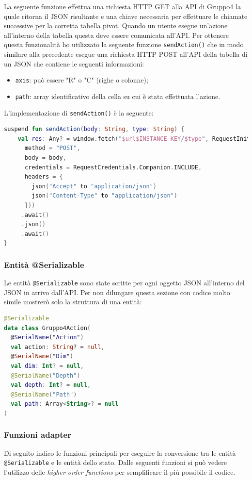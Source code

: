 \noindent
La seguente funzione effettua una richiesta HTTP GET alla API di Gruppo4 la quale ritorna il JSON risultante e una chiave necessaria per effettuare le chiamate successive per la corretta tabella pivot. Quando un utente esegue un'azione all'interno della tabella questa deve essere comunicata all'API. Per ottenere questa funzionalità ho utilizzato la seguente funzione \verb|sendAction()| che in modo similare alla precedente esegue una richiesta HTTP POST all'API della tabella di un JSON che contiene le seguenti informazioni:
\begin{itemize}
	\item \verb|axis|: può essere "R" o "C" (righe o colonne);
	\item \verb|path|: array identificativo della cella su cui è stata effettuata l'azione.
\end{itemize}
L'implementazione di \verb|sendAction()| è la seguente: 
\begin{lstlisting}[caption={Funzione sendAction()}, label={lst:bodycells}, language=Kotlin]
suspend fun sendAction(body: String, type: String) {
    val res: Any? = window.fetch("$url$INSTANCE_KEY/$type", RequestInit(
      method = "POST",
      body = body,
      credentials = RequestCredentials.Companion.INCLUDE,
      headers = {
        json("Accept" to "application/json")
        json("Content-Type" to "application/json")
      }))
     .await()
     .json()
     .await()
}
\end{lstlisting}

\subsubsection{Entità @Serializable}
Le entità \verb|@Serializable| sono state scritte per ogni oggetto JSON all'interno del JSON in arrivo dall'API. Per non dilungare questa sezione con codice molto simile mostrerò solo la struttura di una entità:
\begin{lstlisting}[caption={data class Gruppo4Action}, label={lst:bodycells}, language=Kotlin]
@Serializable
data class Gruppo4Action(
  @SerialName("Action")
  val action: String? = null,
  @SerialName("Dim")
  val dim: Int? = null,
  @SerialName("Depth")
  val depth: Int? = null,
  @SerialName("Path")
  val path: Array<String>? = null
)
\end{lstlisting}
\subsubsection{Funzioni adapter}
Di seguito indico le funzioni principali per eseguire la conversione tra le entità \verb|@Serializable| e le entità dello stato. Dalle seguenti funzioni si può vedere l'utilizzo delle \emph{higher order functions} per semplificare il più possibile il codice.

